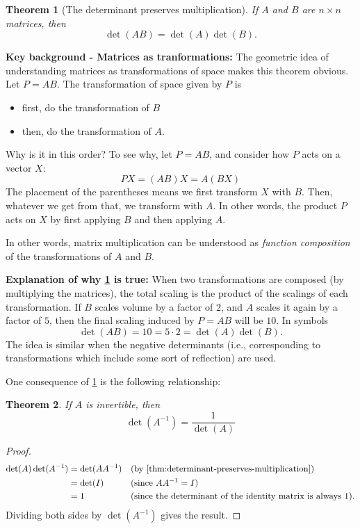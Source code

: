 \documentclass[10pt]{article}
\newtheorem{theorem}{Theorem}
\theoremstyle{definition}
\newcommand{\Fl}[1]{\vspace{5mm}\noindent\textbf{#1}}%
\begin{document}
\begin{theorem}[The determinant preserves multiplication]
  \label{thm:determinant-preserves-multiplication}
  If $A$ and $B$ are $n\times n$ matrices, then
  \begin{equation*}
    \det(AB) = \det(A)\det(B).
  \end{equation*}
\end{theorem}
\Fl{Key background - Matrices as tranformations:}
The geometric idea of understanding matrices as transformations of space makes
this theorem obvious. Let $P=AB$. The transformation of space given by $P$ is
\begin{itemize}
  \item first, do the transformation of $B$
  \item then, do the transformation of $A$.
\end{itemize}

Why is it in this order? To see why, let $P=AB$, and consider how $P$ acts on
a vector $X$:
\begin{equation*}
  PX = (AB)X = A(BX)
\end{equation*}
The placement of the parentheses means we first transform $X$ with $B$. Then,
whatever we get from that, we transform with $A$. In other words, the product
$P$ acts on $X$ by first applying $B$ and then applying $A$.

In other words, matrix multiplication can be understood as \textit{function
  composition} of the transformations of $A$ and $B$. 

\Fl{Explanation of why \cref{thm:determinant-preserves-multiplication} is
  true:} When two transformations are composed (by multiplying the matrices),
the total scaling is the product of the scalings of each transformation. If
$B$ scales volume by a factor of $2$, and $A$ scales it again by a factor of
$5$, then the final scaling induced by $P=AB$ will be $10$. In symbols
\begin{equation*}
  \det(AB) = 10 = 5\cdot 2 = \det(A)\det(B).
\end{equation*}
The idea is similar when the negative determinants (i.e., corresponding to
transformations which include some sort of reflection) are used.

One consequence of \cref{thm:determinant-preserves-multiplication} is the
following relationship:
\begin{theorem}
  If $A$ is invertible, then
  \begin{equation*}
    \det(A^{-1})=\frac{1}{\det(A)}
  \end{equation*}
\end{theorem}
\begin{proof}
  \begin{align*}
    \det(A)\det(A^{-1}) 
    &= \det(AA^{-1}) &&\text{(by \cref{thm:determinant-preserves-multiplication})}\\
    &= \det(I) &&\text{(since $AA^{-1}=I$)}\\ 
    &=1 &&\text{(since the determinant of the identity matrix is always 1).}
  \end{align*}
  Dividing both sides by $\det(A^{-1})$ gives the result.
\end{proof}
\end{document}
